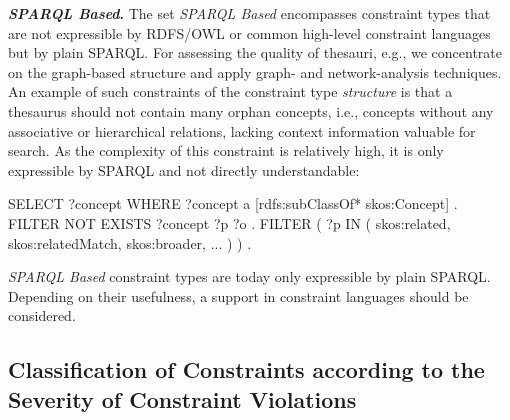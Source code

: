 \documentclass[conference]{IEEEtran}
\begin{document}
\textbf{\emph{SPARQL Based}.}
The set \emph{SPARQL Based} encompasses constraint types that are not expressible by RDFS/OWL or common high-level constraint languages but by plain SPARQL. For assessing the quality of thesauri, e.g., we concentrate on the graph-based structure and apply graph- and network-analysis techniques.
An example of such constraints of the constraint type \emph{structure} is that 
a thesaurus should not contain many orphan concepts, i.e., concepts without any associative or hierarchical relations, lacking context information valuable for search. As the complexity of this constraint is relatively high, it is only expressible by SPARQL and not directly understandable:
\begin{ex}
SELECT ?concept WHERE {
    ?concept a [rdfs:subClassOf* skos:Concept] .
    FILTER NOT EXISTS { ?concept ?p ?o . 
        FILTER ( ?p IN ( skos:related, skos:relatedMatch, 
                         skos:broader, ... ) ) . } }
\end{ex}
\emph{SPARQL Based} constraint types are today only expressible by plain SPARQL. Depending on their usefulness, a support in constraint languages should be considered.

\subsection{Classification of Constraints according to the Severity of Constraint Violations}
\end{document}
